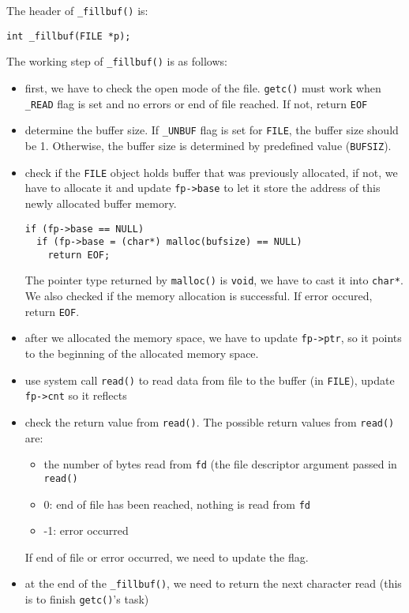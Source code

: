 \documentclass[11pt]{article}
\begin{document}
The header of \texttt{\_fillbuf()} is:
\begin{verbatim}
int _fillbuf(FILE *p);
\end{verbatim}

The working step of \texttt{\_fillbuf()} is as follows:
\begin{itemize}
\item first, we have to check the open mode of the file. \texttt{getc()} must work when \texttt{\_READ} flag is set and no errors or end of file reached. If not, return \texttt{EOF}
\item determine the buffer size. If \texttt{\_UNBUF} flag is set for \texttt{FILE}, the buffer size should be 1. Otherwise, the buffer size is determined by predefined value (\texttt{BUFSIZ}).
\item check if the \texttt{FILE} object holds buffer that was previously allocated, if not, we have to allocate it and update \texttt{fp->base} to let it store the address of this newly allocated buffer memory.
\begin{verbatim}
if (fp->base == NULL)
  if (fp->base = (char*) malloc(bufsize) == NULL)
    return EOF;
\end{verbatim}

The pointer type returned by \texttt{malloc()} is \texttt{void}, we have to cast it into \texttt{char*}. We also checked if the memory allocation is successful. If error occured, return \texttt{EOF}.
\item after we allocated the memory space, we have to update \texttt{fp->ptr}, so it points to the beginning of the allocated memory space.
\item use system call \texttt{read()} to read data from file to the buffer (in \texttt{FILE}), update \texttt{fp->cnt} so it reflects
\item check the return value from \texttt{read()}. The possible return values from \texttt{read()} are:
\begin{itemize}
\item the number of bytes read from \texttt{fd} (the file descriptor argument passed in \texttt{read()}
\item 0: end of file has been reached, nothing is read from \texttt{fd}
\item -1: error occurred
\end{itemize}
If end of file or error occurred, we need to update the flag.
\item at the end of the \texttt{\_fillbuf()}, we need to return the next character read (this is to finish \texttt{getc()}'s task)
\end{itemize}
\end{document}
